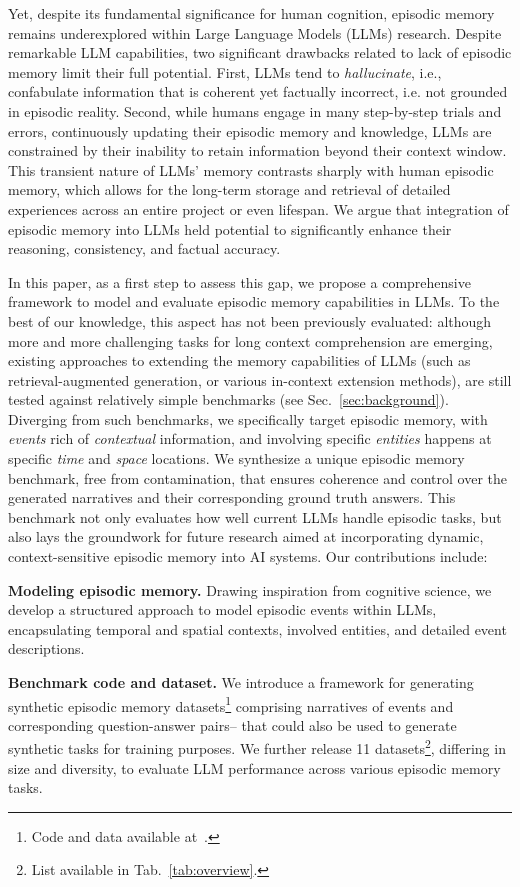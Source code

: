 \documentclass{article}
\begin{document}
Yet, despite its fundamental significance for human cognition, episodic memory remains underexplored within Large Language Models (LLMs) research. Despite remarkable LLM capabilities, two significant drawbacks related to lack of episodic memory limit their full potential. First, LLMs tend to \textit{hallucinate}, i.e.,  confabulate information that is coherent yet factually incorrect, i.e. not grounded in episodic reality. Second, while humans engage in many step-by-step trials and errors, continuously updating their episodic memory and knowledge, LLMs are constrained by their inability to retain information beyond their context window. This transient nature of LLMs' memory contrasts sharply with human episodic memory, which allows for the long-term storage and retrieval of detailed experiences across an entire project or even lifespan.  We argue that integration of episodic memory into LLMs held potential to significantly enhance their reasoning, consistency, and factual accuracy.

In this paper, as a first step to assess this gap, we propose a comprehensive framework to model and evaluate episodic memory capabilities in LLMs. To the best of our knowledge, this aspect has not been previously evaluated:  although more and more challenging tasks for long context comprehension are emerging, existing approaches to extending the memory capabilities of LLMs (such as retrieval-augmented generation, or various in-context extension methods), are still tested against relatively simple benchmarks (see Sec.~\ref{sec:background}). 
Diverging from such benchmarks, we specifically target episodic memory, with \textit{events} rich of \textit{contextual} information, and involving specific \textit{entities} happens at specific \textit{time} and \textit{space} locations. We synthesize a unique episodic memory benchmark, free from contamination, that ensures coherence and control over the generated narratives and their corresponding ground truth answers. This benchmark not only evaluates how well current LLMs handle episodic tasks, but also lays the groundwork for future research aimed at incorporating dynamic, context-sensitive episodic memory into AI systems. Our contributions include:

\noindent \textbf{Modeling episodic memory.} Drawing inspiration from cognitive science, we develop a structured approach to model episodic events within LLMs, encapsulating temporal and spatial contexts, involved entities, and detailed event descriptions.

\noindent \textbf{Benchmark code and dataset.}  We introduce a framework for generating synthetic episodic memory datasets\footnote{Code and data available at~\citet{codeAvailability}.} comprising narratives of events and corresponding question-answer pairs-- that could also be used to generate synthetic tasks for training purposes. %
We further release 11 datasets\footnote{List available in Tab.~\ref{tab:overview}.}, differing in size and diversity, to evaluate LLM performance across various episodic memory tasks.
\end{document}
